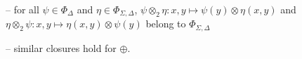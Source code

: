\noindent -- 
for all $\psi \in \Phi_\Delta$ and $\eta \in \Phi_{\Sigma, \Delta}$,
$\psi \otimes_2 \eta: x, y \mapsto \psi(y) \otimes \eta(x, y)$ and\\
\phantom{--} $\eta \otimes_2 \psi: x, y \mapsto \eta(x, y) \otimes \psi(y)$ 
belong to $\Phi_{\Sigma, \Delta}$

\noindent -- 
similar closures hold for $\oplus$.


%
%
\noindent 
